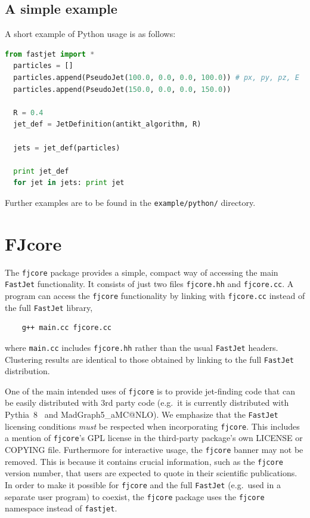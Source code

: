 \documentclass[12pt,a4]{article}
\newcommand{\fastjet}{\texttt{FastJet}\xspace}
\newcommand{\fjcore}{\texttt{fjcore}\xspace}
\newcommand{\ttt}[1]{{\small\texttt{#1}}}
\begin{document}
\subsection{A simple example}
\label{sec:python-example}

A short example of Python usage is as follows:
%
\begin{lstlisting}[language=Python]
  from fastjet import *
  particles = []
  particles.append(PseudoJet(100.0, 0.0, 0.0, 100.0)) # px, py, pz, E
  particles.append(PseudoJet(150.0, 0.0, 0.0, 150.0))

  R = 0.4
  jet_def = JetDefinition(antikt_algorithm, R)

  jets = jet_def(particles)

  print jet_def
  for jet in jets: print jet
\end{lstlisting}
Further examples are to be found in the \ttt{example/python/}
directory.

\section{FJcore}
\label{sec:fjcore}

The \ttt{fjcore} package provides a simple, compact way of accessing
the main \fastjet functionality.
%
It consists of just two files \ttt{fjcore.hh} and \ttt{fjcore.cc}.
%
A program can access the \ttt{fjcore} functionality by linking with
\ttt{fjcore.cc} instead of the full \fastjet library,
\begin{lstlisting}
    g++ main.cc fjcore.cc
\end{lstlisting}
where \ttt{main.cc} includes \ttt{fjcore.hh} rather than the usual
\fastjet headers.
%
Clustering results are identical to those obtained by linking to the
full \fastjet distribution.

One of the main intended uses of \fjcore is to provide jet-finding
code that can be easily distributed with 3rd party code (e.g.\ it is
currently distributed with Pythia~8~\cite{Sjostrand:2007gs} and
MadGraph5\_aMC@NLO).
%
We emphasize that the \fastjet licensing conditions \emph{must} be
respected when incorporating \fjcore.
%
This includes a mention of \fjcore's GPL license in the third-party
package's own LICENSE or COPYING file.
%
Furthermore for interactive usage, the \fjcore banner may not be
removed.
%
This is because it contains crucial information, such as the \fjcore version
number, that users are expected to quote in their scientific
publications.
%
In order to make it possible for \ttt{fjcore} and the full \fastjet
(e.g.\ used in a separate user program) to coexist, the \fjcore
package uses the \ttt{fjcore} namespace instead of \ttt{fastjet}.
\end{document}
